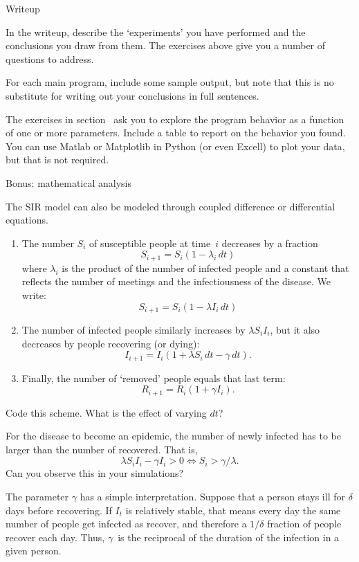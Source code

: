  {Writeup}

In the writeup, describe the `experiments' you have performed and the
conclusions you draw from them. The exercises above give you a number
of questions to address.

For each main program, include some sample output, but note that this
is no substitute for writing out your conclusions in full sentences.

The exercises in section~
ask you to explore the program behavior as a
function of one or more parameters. Include a table to report on the
behavior you found. You can use Matlab or Matplotlib in Python (or
even Excell) to plot your data, but that is not required.

 {Bonus: mathematical analysis}

The SIR model can also be modeled through coupled difference or differential
equations. 
\begin{enumerate}
\item The number $S_i$ of susceptible people at time~$i$ decreases by a fraction
  \[ S_{i+1} = S_i(1-\lambda_i\,dt)\]
  where $\lambda_i$ is the product of the number of infected people
  and a constant that reflects the number of meetings and the infectiousness
  of the disease. We write:
  \[ S_{i+1} = S_i(1-\lambda I_i\,dt)\]
\item The number of infected people similarly increases by $\lambda S_iI_i$,
  but it also decreases by people recovering (or dying):
  \[ I_{i+1} = I_i(1+\lambda S_i\,dt-\gamma\,dt). \]
\item Finally, the number of `removed' people equals that last term:
  \[ R_{i+1} = R_i(1+\gamma I_i). \]
\end{enumerate}

\begin{exercise}
  Code this scheme. What is the effect of varying $dt$?
\end{exercise}

\begin{exercise}
  For the disease to become an epidemic, the number of newly infected
  has to be larger than the number of recovered. That is,
  \[ \lambda S_iI_i - \gamma I_i>0 \Leftrightarrow S_i>\gamma/\lambda. \]
  Can you observe this in your simulations?
\end{exercise}

The parameter $\gamma$ has a simple interpretation. Suppose that a person
stays ill for $\delta$ days before recovering.
If $I_t$ is relatively stable, that means every day the same number of people
get infected as recover, and therefore a $1/\delta$ fraction of people
recover each day. Thus, $\gamma$~is the reciprocal of the duration of the infection
in a given person.

